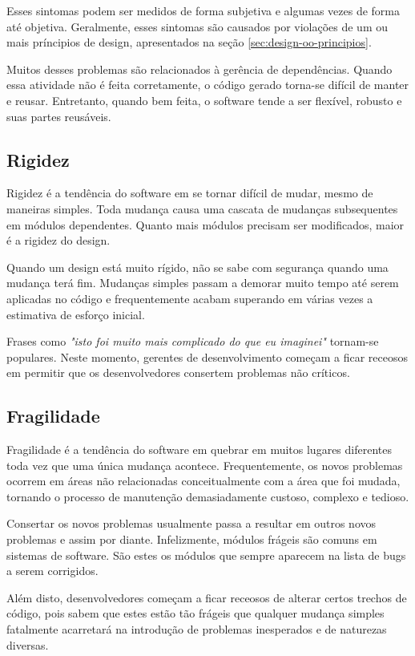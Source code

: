 Esses sintomas podem ser medidos de forma subjetiva e algumas vezes de forma 
até objetiva. Geralmente, esses sintomas são causados por violações de um ou 
mais príncipios de design, apresentados na seção \ref{sec:design-oo-principios}.

Muitos desses problemas são relacionados à gerência de dependências. Quando essa
atividade não é feita corretamente, o código gerado torna-se difícil de manter e
reusar. Entretanto, quando bem feita, o software tende a ser flexível, robusto 
e suas partes reusáveis.

\subsection{Rigidez}
\label{subsec:rigidez}

Rigidez é a tendência do software em se tornar difícil de mudar, mesmo de 
maneiras simples. Toda mudança causa uma cascata de mudanças subsequentes  em
módulos dependentes. Quanto mais módulos precisam ser modificados,  maior é a
rigidez do design. 

Quando um design está muito rígido, não se sabe com segurança quando uma 
mudança terá fim. Mudanças simples passam a demorar muito tempo até serem 
aplicadas no código e frequentemente acabam superando em várias vezes a 
estimativa de esforço inicial. 

Frases como \textit{"isto foi muito mais complicado do que eu imaginei"} 
tornam-se populares. Neste momento, gerentes de desenvolvimento começam a  ficar
receosos em permitir que os desenvolvedores consertem problemas não críticos.

\subsection{Fragilidade}
\label{subsec:fragilidade}

Fragilidade é a tendência do software em quebrar em muitos lugares diferentes 
toda vez que uma única mudança acontece. Frequentemente, os novos problemas
ocorrem  em áreas não relacionadas conceitualmente com a área que foi mudada, 
tornando o processo de manutenção demasiadamente custoso, complexo e tedioso. 

Consertar os novos problemas usualmente passa a resultar em outros novos
problemas  e assim por diante. Infelizmente, módulos frágeis são comuns  em
sistemas de software. São estes os módulos que sempre aparecem na lista de  bugs
a serem corrigidos. 

Além disto, desenvolvedores começam a ficar receosos de alterar certos trechos 
de código, pois sabem que estes estão tão frágeis que qualquer mudança simples 
fatalmente acarretará na introdução de problemas inesperados e de  naturezas
diversas.

